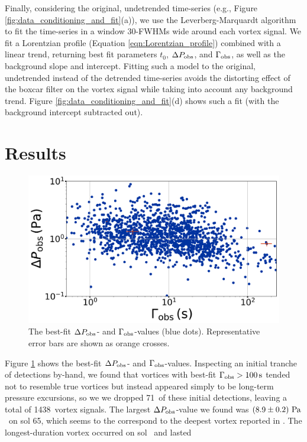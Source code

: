 \documentclass{aastex63}
\newcommand{\totalvortices}{1438}
\newcommand{\maskedvortices}{71}
\newcommand{\largestDeltaPobs}{$\left( 8.9 \pm 0.2 \right)\,{\rm Pa}$}
\newcommand{\largestDeltaPobssol}{65}
\begin{document}
Finally, considering the original, undetrended time-series (e.g., Figure \ref{fig:data_conditioning_and_fit}(a)), we use the Leverberg-Marquardt algorithm \citep[cf.][]{Press2007} to fit the time-series in a window 30-FWHMs wide around each vortex signal. We fit a Lorentzian profile (Equation \ref{eqn:Lorentzian_profile}) combined with a linear trend, returning best fit parameters $t_0$, $\Delta P_{\rm obs}$, and $\Gamma_{\rm obs}$, as well as the background slope and intercept. Fitting such a model to the original, undetrended instead of the detrended time-series avoids the distorting effect of the boxcar filter on the vortex signal while taking into account any background trend. Figure \ref{fig:data_conditioning_and_fit}(d) shows such a fit (with the background intercept subtracted out).

\section{Results}
\begin{figure}
    \centering
    \includegraphics[width=\textwidth]{figures/DeltaPobs_vs_Gammaobs.png}
    \caption{The best-fit $\Delta P_{\rm obs}$- and $\Gamma_{\rm obs}$-values (blue dots). Representative error bars are shown as orange crosses.}
    \label{fig:DeltaPobs_vs_Gammaobs}
\end{figure}

Figure \ref{fig:DeltaPobs_vs_Gammaobs} shows the best-fit $\Delta P_{\rm obs}$- and $\Gamma_{\rm obs}$-values. Inspecting an initial tranche of detections by-hand, we found that vortices with best-fit $\Gamma_{\rm obs} > 100\,{\rm s}$ tended not to resemble true vortices but instead appeared simply to be long-term pressure excursions, so we we dropped \maskedvortices\ of these initial detections, leaving a total of \totalvortices\ vortex signals. The largest $\Delta P_{\rm obs}$-value we found was \largestDeltaPobs\ on sol \largestDeltaPobssol, which seems to the correspond to the deepest vortex reported in \citet{2020arXiv200501134S}. The longest-duration vortex occurred on sol \largestGammaobssol\ and lasted 
\end{document}
